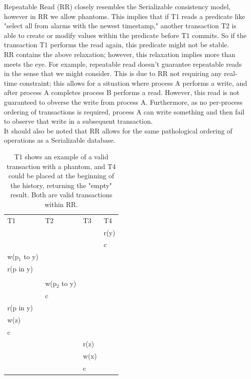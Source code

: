 \documentclass[a4paper,10pt,titlepage]{report}
\begin{document}
Repeatable Read (RR) closely resembles the Serializable consistency model, however in RR we allow phantoms. This implies that if T1 reads a predicate like "select all from alarms with the newest timestamp," another transaction T2 is able to create or modify values within the predicate before T1 commits. So if the transaction T1 performs the read again, this predicate might not be stable.
\\ \vspace{5mm}
RR contains the above relaxation; however, this relaxation implies more than meets the eye. For example, repeatable read doesn't guarantee repeatable reads in the sense that we might consider. This is due to RR not requiring any real-time constraint; this allows for a situation where process A performs a write, and after process A completes process B performs a read. However, this read is not guaranteed to obverse the write from process A. Furthermore, as no per-process ordering of transactions is required, process A can write something and then fail to observe that write in a subsequent transaction.
\\ \vspace{5mm}
It should also be noted that RR allows for the same pathological ordering of operations as a Serializable database.

\begin{table}[h]
    \begin{tabular}{l|l|l|l}
        T1            & T2            & T3   & T4   \\
        &               &      & r(y) \\
        &               &      & c    \\
        w(p$_1$ to y) &               &      &      \\
        r(p in y)     &               &      &      \\
        &               &      &      \\
        & w(p$_2$ to y) &      &      \\
        & c             &      &      \\
        r(p in y)     &               &      &      \\
        w(z)          &               &      &      \\
        c             &               &      &      \\
        &               & r(z) &      \\
        &               & w(x) &      \\
        &               & c    &
    \end{tabular}
    \caption{T1 shows an example of a valid transaction with a phantom, and T4 could be placed at the beginning of the history, returning the "empty" result. Both are valid transactions within RR.}
\end{table}
\end{document}
